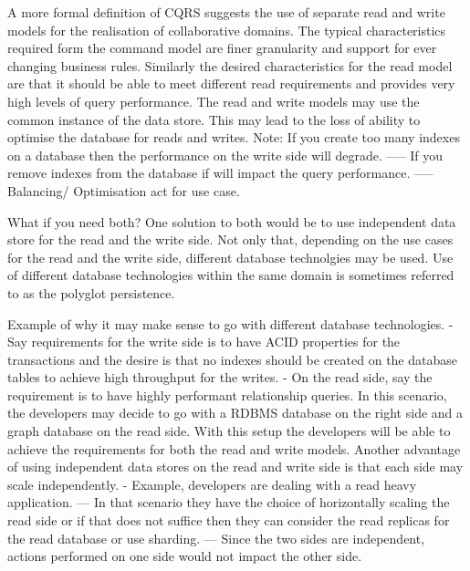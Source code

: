 A more formal definition of CQRS suggests the use of separate read and write models for the realisation of collaborative domains.
The typical characteristics required form the command model are finer granularity and support for ever changing business rules.
Similarly the desired characteristics for the read model are that it should be able to meet different read requirements and provides very high levels of query performance.
The read and write models may use the common instance of the data store.
This may lead to the loss of ability to optimise the database for reads and writes.
Note: If you create too many indexes on a database then the performance on the write side will degrade.
----- If you remove indexes from the database if will impact the query performance.
----- Balancing/ Optimisation act for use case.

What if you need both?
One solution to both would be to use independent data store for the read and the write side.
Not only that, depending on the use cases for the read and the write side, different database technolgies may be used.
Use of different database technologies within the same domain is sometimes referred to as the polyglot persistence.

Example of why it may make sense to go with different database technologies.
- Say requirements for the write side is to have ACID properties for the transactions and the desire is that no indexes should be created on the database tables to achieve high throughput for the writes.
- On the read side, say the requirement is to have highly performant relationship queries.
In this scenario, the developers may decide to go with a RDBMS database on the right side and a graph database on the read side.
With this setup the developers will be able to achieve the requirements for both the read and write models.
Another advantage of using independent data stores on the read and write side is that each side may scale independently.
- Example, developers are dealing with a read heavy application.
--- In that scenario they have the choice of horizontally scaling the read side or if that does not suffice then they can consider the read replicas for the read database or use sharding.
--- Since the two sides are independent, actions performed on one side would not impact the other side.

